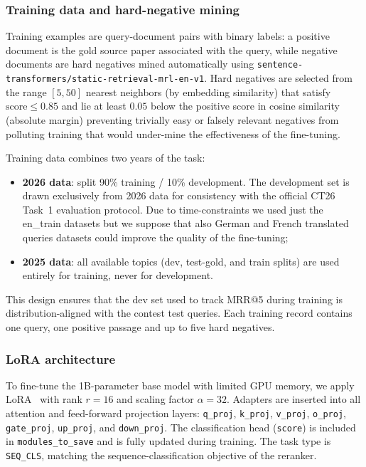 \subsubsection*{Training data and hard-negative mining}
Training examples are query-document pairs with binary labels: a positive document is the gold source paper associated with the query, while negative documents are hard negatives mined automatically using \texttt{sentence-transformers/static-retrieval-mrl-en-v1}. Hard negatives are selected from the range $[5, 50]$ nearest neighbors (by embedding similarity) that satisfy $\text{score} \leq 0.85$ and lie at least $0.05$ below the positive score in cosine similarity (absolute margin) preventing trivially easy or falsely relevant negatives from polluting training that would under-mine the effectiveness of the fine-tuning.

Training data combines two years of the task:
\begin{itemize}
  \item \textbf{2026 data}: split 90\% training / 10\% development. The development set is drawn exclusively from 2026 data for consistency with the official CT26 Task~1 evaluation protocol. Due to time-constraints we used just the en\_train datasets but we suppose that also German and French translated queries datasets could improve the quality of the fine-tuning;
  \item \textbf{2025 data}: all available topics (dev, test-gold, and train splits) are used entirely for training, never for development.
\end{itemize}
This design ensures that the dev set used to track MRR@5 during training is distribution-aligned with the contest test queries. Each training record contains one query, one positive passage and up to five hard negatives.

\subsubsection*{LoRA architecture}
To fine-tune the 1B-parameter base model with limited GPU memory, we apply LoRA~\cite{hu2022lora} with rank $r = 16$ and scaling factor $\alpha = 32$. Adapters are inserted into all attention and feed-forward projection layers:
\texttt{q\_proj}, \texttt{k\_proj}, \texttt{v\_proj}, \texttt{o\_proj}, \texttt{gate\_proj}, \texttt{up\_proj}, and \texttt{down\_proj}.
The classification head (\texttt{score}) is included in
\texttt{modules\_to\_save} and is fully updated during training. The task type is \texttt{SEQ\_CLS}, matching the sequence-classification objective of the reranker.


